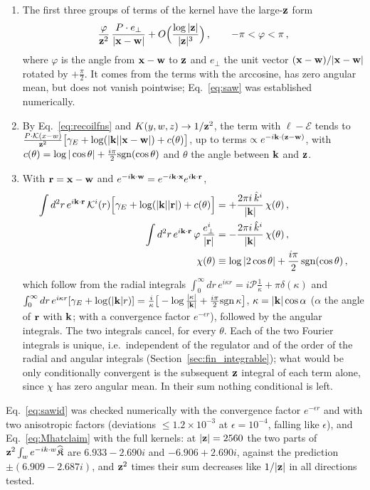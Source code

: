\begin{enumerate}
\item The first three groups of terms of the kernel have the large-$\mathbf{z}$ form
\begin{align}\label{eq:saw}
\frac{\varphi}{\mathbf{z}^2}\,\frac{P\cdot e_\perp}{|\mathbf{x}-\mathbf{w}|}+O\Big(\frac{\log|\mathbf{z}|}{|\mathbf{z}|^3}\Big)\,,\qquad-\pi<\varphi<\pi\,,
\end{align}
where $\varphi$ is the angle from $\mathbf{x}-\mathbf{w}$ to $\mathbf{z}$ and $e_\perp$ the unit vector $(\mathbf{x}-\mathbf{w})/|\mathbf{x}-\mathbf{w}|$ rotated by $+\frac\pi2$. It comes from the terms with the arccosine, has zero angular mean, but does not vanish pointwise; Eq.~\eqref{eq:saw} was established numerically.
\item By Eq.~\eqref{eq:recoilfns} and $K(y,w,z)\to1/\mathbf{z}^2$, the term with $\ell-\mathcal E$ tends to $\frac{P\cdot\mathcal{K}(x-w)}{\mathbf{z}^2}\big[\gamma_E+\log(|\mathbf{k}||\mathbf{x}-\mathbf{w}|)+c(\theta)\big]$, up to terms $\propto e^{-i\mathbf{k}\cdot(\mathbf{z}-\mathbf{w})}$, with $c(\theta)=\log|\cos\theta|+\frac{i\pi}{2}{\rm sgn}(\cos\theta)$ and $\theta$ the angle between $\mathbf{k}$ and $\mathbf{z}$.
\item With $\mathbf{r}=\mathbf{x}-\mathbf{w}$ and $e^{-i\mathbf{k}\cdot\mathbf{w}}=e^{-i\mathbf{k}\cdot\mathbf{x}}e^{i\mathbf{k}\cdot\mathbf{r}}$,
\begin{align}\label{eq:sawid}
\int d^2r\,e^{i\mathbf{k}\cdot\mathbf{r}}\,\mathcal{K}^i(r)\Big[\gamma_E+\log(|\mathbf{k}||\mathbf{r}|)+c(\theta)\Big]&=+\frac{2\pi i\,\hat k^i}{|\mathbf{k}|}\,\chi(\theta)\,,\notag\\
\int d^2r\,e^{i\mathbf{k}\cdot\mathbf{r}}\,\varphi\,\frac{e_\perp^i}{|\mathbf{r}|}&=-\frac{2\pi i\,\hat k^i}{|\mathbf{k}|}\,\chi(\theta)\,,\notag\\
\chi(\theta)&\equiv\log|2\cos\theta|+\frac{i\pi}{2}\,{\rm sgn}(\cos\theta)\,,
\end{align}
which follow from the radial integrals $\int_0^\infty dr\,e^{i\kappa r}=i\mathcal P\frac1\kappa+\pi\delta(\kappa)$ and $\int_0^\infty dr\,e^{i\kappa r}[\gamma_E+\log(|\mathbf{k}|r)]=\frac{i}{\kappa}\big[-\log\frac{|\kappa|}{|\mathbf{k}|}+\frac{i\pi}{2}{\rm sgn}\,\kappa\big]$, $\kappa=|\mathbf{k}|\cos\alpha$ ($\alpha$ the angle of $\mathbf{r}$ with $\mathbf{k}$; with a convergence factor $e^{-\epsilon r}$), followed by the angular integrals. The two integrals cancel, for every $\theta$. Each of the two Fourier integrals is unique, i.e.\ independent of the regulator and of the order of the radial and angular integrals (Section~\ref{sec:fin_integrable}); what would be only conditionally convergent is the subsequent $\mathbf{z}$ integral of each term alone, since $\chi$ has zero angular mean. In their sum nothing conditional is left.
\end{enumerate}
Eq.~\eqref{eq:sawid} was checked numerically with the convergence factor $e^{-\epsilon r}$ and with two anisotropic factors (deviations $\le1.2\times10^{-3}$ at $\epsilon=10^{-4}$, falling like $\epsilon$), and Eq.~\eqref{eq:Mhatclaim} with the full kernels: at $|\mathbf{z}|=2560$ the two parts of $\mathbf{z}^2\int_we^{-ik\cdot w}\widehat{\mathfrak K}$ are $6.933-2.690i$ and $-6.906+2.690i$, against the prediction $\pm(6.909-2.687i)$, and $\mathbf{z}^2$ times their sum decreases like $1/|\mathbf{z}|$ in all directions tested.


